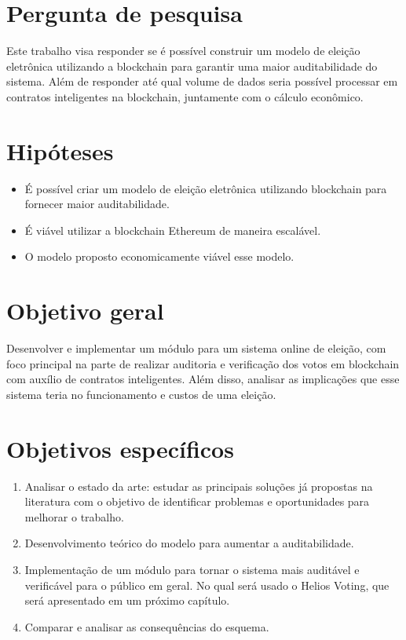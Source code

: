 \documentclass{ufsctex/ufsctex}
\begin{document}
\section{Pergunta de pesquisa}

Este trabalho visa responder se é possível construir um modelo de eleição
eletrônica utilizando a blockchain para garantir uma maior auditabilidade do
sistema. Além de responder até qual volume de dados seria possível processar em
contratos inteligentes na blockchain, juntamente com o cálculo econômico.

\section{Hipóteses}

\begin{itemize}
	\item É possível criar um modelo de eleição eletrônica utilizando blockchain
		para fornecer maior auditabilidade.
	\item É viável utilizar a blockchain Ethereum de maneira escalável.
	\item O modelo proposto economicamente viável esse modelo.
\end{itemize}

\section{Objetivo geral}

Desenvolver e implementar um módulo para um sistema online de eleição, com foco
principal na parte de realizar auditoria e verificação dos votos em blockchain
com auxílio de contratos inteligentes. Além disso, analisar as implicações que
esse sistema teria no funcionamento e custos de uma eleição.

\section{Objetivos específicos}

\begin{enumerate}[label=\roman*.]
	\item Analisar o estado da arte: estudar as principais soluções
	já propostas na literatura com o objetivo de identificar problemas
	e oportunidades para melhorar o trabalho.
	\item Desenvolvimento teórico do modelo para aumentar a auditabilidade.
	\item Implementação de um módulo para tornar o sistema mais auditável e
		verificável para o público em geral. No qual será usado o Helios
		Voting, que será apresentado em um próximo capítulo.
	\item Comparar e analisar as consequências do esquema.
\end{enumerate}
\end{document}
